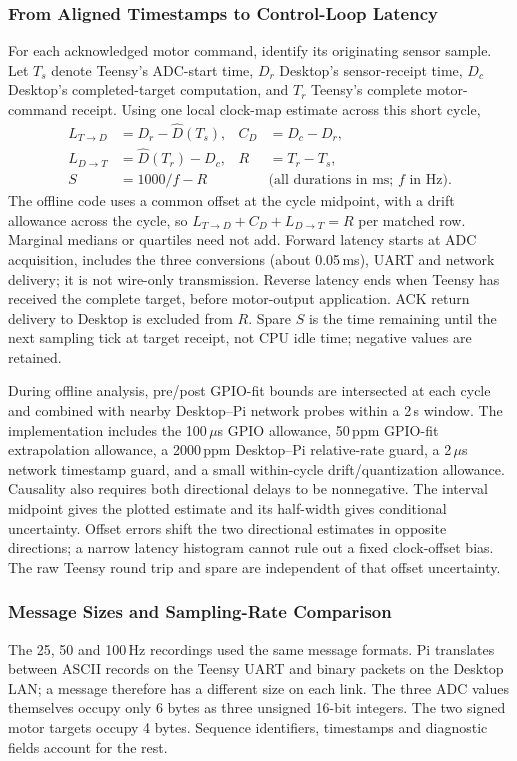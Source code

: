 \subsubsection{From Aligned Timestamps to Control-Loop Latency}
For each acknowledged motor command, identify its originating sensor sample. Let $T_s$ denote Teensy's ADC-start time, $D_r$ Desktop's sensor-receipt time, $D_c$ Desktop's completed-target computation, and $T_r$ Teensy's complete motor-command receipt. Using one local clock-map estimate across this short cycle,
\begin{align}
 L_{T\to D}&=D_r-\widehat D(T_s), & C_D&=D_c-D_r,\\
 L_{D\to T}&=\widehat D(T_r)-D_c, & R&=T_r-T_s,\\
 S&=1000/f-R &&\text{(all durations in ms; $f$ in Hz).}
\end{align}
The offline code uses a common offset at the cycle midpoint, with a drift allowance across the cycle, so $L_{T\to D}+C_D+L_{D\to T}=R$ per matched row. Marginal medians or quartiles need not add. Forward latency starts at ADC acquisition, includes the three conversions (about 0.05\,ms), UART and network delivery; it is not wire-only transmission. Reverse latency ends when Teensy has received the complete target, before motor-output application. ACK return delivery to Desktop is excluded from $R$. Spare $S$ is the time remaining until the next sampling tick at target receipt, not CPU idle time; negative values are retained.

During offline analysis, pre/post GPIO-fit bounds are intersected at each cycle and combined with nearby Desktop--Pi network probes within a 2\,s window. The implementation includes the 100\,$\mu$s GPIO allowance, 50\,ppm GPIO-fit extrapolation allowance, a 2000\,ppm Desktop--Pi relative-rate guard, a 2\,$\mu$s network timestamp guard, and a small within-cycle drift/quantization allowance. Causality also requires both directional delays to be nonnegative. The interval midpoint gives the plotted estimate and its half-width gives conditional uncertainty. Offset errors shift the two directional estimates in opposite directions; a narrow latency histogram cannot rule out a fixed clock-offset bias. The raw Teensy round trip and spare are independent of that offset uncertainty.

\subsubsection{Message Sizes and Sampling-Rate Comparison}
\label{sec:message-sizes}
The 25, 50 and 100\,Hz recordings used the same message formats. Pi translates between ASCII records on the Teensy UART and binary packets on the Desktop LAN; a message therefore has a different size on each link. The three ADC values themselves occupy only 6 bytes as three unsigned 16-bit integers. The two signed motor targets occupy 4 bytes. Sequence identifiers, timestamps and diagnostic fields account for the rest.

